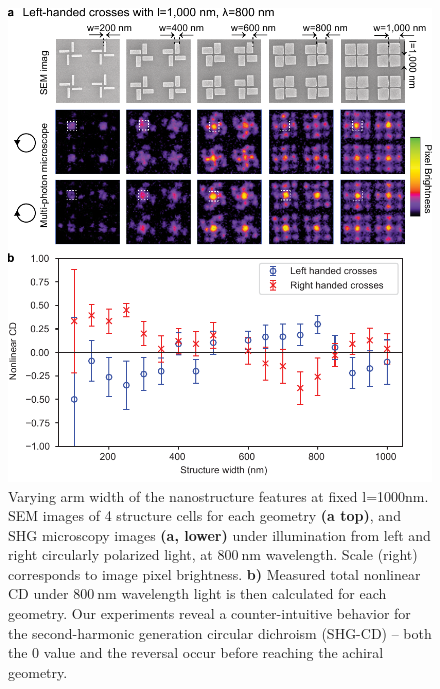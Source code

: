 \begin{figure}[htb!]	
    \centering	
    \includegraphics[scale=0.8]{./figures/results/EnantiomorphingChiralCrosses/l1000data.pdf}
    \caption{\label{fig:results:EnantiomorphingChiralCrosses:l1000data}
    Varying arm width of the nanostructure features at fixed l=1000nm. SEM images of 4 structure cells for each geometry \textbf{(a top)}, and SHG microscopy images \textbf{(a, lower)} under illumination from left and right circularly polarized light, at $\SI{800}{\nano\m}$ wavelength. Scale (right) corresponds to image pixel brightness. \textbf{b)} Measured total nonlinear CD under $\SI{800}{\nano\m}$ wavelength light is then calculated for each geometry. Our experiments reveal a counter-intuitive behavior for the second-harmonic generation circular dichroism (SHG-CD) – both the 0 value and the reversal occur before reaching the achiral geometry.}	
\end{figure}

